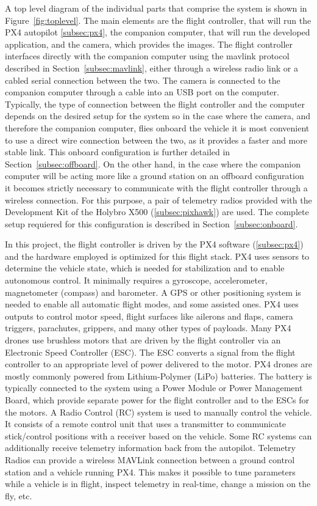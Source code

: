 A top level diagram of the individual parts that comprise the system is shown in Figure~\ref{fig:toplevel}. The main elements are the flight controller, that will run the PX4 autopilot \ref{subsec:px4}, the companion computer, that will run the developed application, and the camera, which provides the images.
The flight controller interfaces directly with the companion computer using the \gls{mavlink} protocol described in Section~\ref{subsec:mavlink}, either through a wireless radio link or a cabled serial connection between the two.
The camera is connected to the companion computer through a cable into an USB port on the computer.
Typically, the type of connection between the flight controller and the computer depends on the desired setup for the system so in the case where the camera, and therefore the companion computer, flies onboard the vehicle it is most convenient to use a direct wire connection between the two, as it provides a faster and more stable link. 
This onboard configuration is further detailed in Section~\ref{subsec:offboard}.
On the other hand, in the case where the companion computer will be acting more like a ground station on an offboard configuration it becomes strictly necessary to communicate with the flight controller through a wireless connection. For this purpose, a pair of telemetry radios provided with the Development Kit of the Holybro X500 (\ref{subsec:pixhawk}) are used. The complete setup requiered for this configuration is described in Section~\ref{subsec:onboard}.

In this project, the flight controller is driven by the PX4 software (\ref{subsec:px4}) and the hardware employed is optimized for this flight stack.
PX4 uses sensors to determine the vehicle state, which is needed for stabilization and to enable autonomous control.
It minimally requires a gyroscope, accelerometer, magnetometer (compass) and barometer.
A GPS or other positioning system is needed to enable all automatic flight modes, and some assisted ones.
PX4 uses outputs to control motor speed, flight surfaces like ailerons and flaps, camera triggers, parachutes, grippers, and many other types of payloads.
Many PX4 drones use brushless motors that are driven by the flight controller via an Electronic Speed Controller (ESC).
The ESC converts a signal from the flight controller to an appropriate level of power delivered to the motor.
PX4 drones are mostly commonly powered from Lithium-Polymer (LiPo) batteries.
The battery is typically connected to the system using a Power Module or Power Management Board, 
which provide separate power for the flight controller and to the ESCs for the motors.
A Radio Control (RC) system is used to manually control the vehicle.
It consists of a remote control unit that uses a transmitter to communicate stick/control positions with a receiver based on the vehicle.
Some RC systems can additionally receive telemetry information back from the autopilot.
Telemetry Radios can provide a wireless MAVLink connection between a ground control station and a vehicle running PX4.
This makes it possible to tune parameters while a vehicle is in flight, inspect telemetry in real-time, change a mission on the fly, etc.

